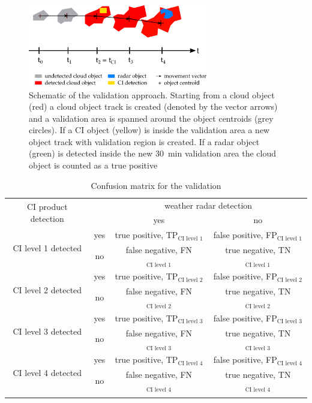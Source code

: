 \begin{figure}[htbp]
\centering
\includegraphics[width=0.7\textwidth]{Grafiken/Abbildungen/verification_scheme_new.pdf}
\caption{Schematic of the validation approach. Starting from a cloud object (red) a cloud object track is created (denoted by the vector arrows) and a validation area is spanned around the object centroids (grey circles). If a CI object (yellow) is inside the validation area a new object track with validation region is created. If a radar object (green) is detected inside the new \SI{30}{\minute} validation area the cloud object is counted as a true positive}
\label{fig:schema}
\end{figure}

\begin{table}[htb]
\centering
\caption{Confusion matrix for the validation}
\begin{tabular}{cccc} 
\toprule
\multirow{2}{*}{CI product detection} &     & \multicolumn{2}{c}{weather radar detection} \\
							   						  \cmidrule{3-4}
									  &     & yes   		   & no \\
\midrule
\multirow{2}{*}{CI level 1 detected}  & yes & true positive, TP$_\text{CI level 1}$  & false positive, FP$_\text{CI level 1}$ \\
	                                  & no  & false negative, FN$_\text{CI level 1}$  & true negative, TN$_\text{CI level 1}$ \\ 
\multirow{2}{*}{CI level 2 detected}  & yes & true positive, TP$_\text{CI level 2}$  & false positive, FP$_\text{CI level 2}$ \\ 
	                                  & no  & false negative, FN$_\text{CI level 2}$  & true negative, TN$_\text{CI level 2}$ \\ 
\multirow{2}{*}{CI level 3 detected}  & yes & true positive, TP$_\text{CI level 3}$  & false positive, FP$_\text{CI level 3}$ \\ 
	                                  & no  & false negative, FN$_\text{CI level 3}$  & true negative, TN$_\text{CI level 3}$ \\ 
\multirow{2}{*}{CI level 4 detected}  & yes & true positive, TP$_\text{CI level 4}$  & false positive, FP$_\text{CI level 4}$ \\ 
	                                  & no  & false negative, FN$_\text{CI level 4}$  & true negative, TN$_\text{CI level 4}$ \\
\addlinespace
\bottomrule
\end{tabular}
\label{tab:confusion}
\end{table}

